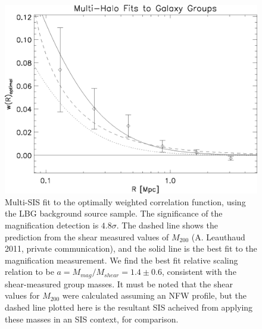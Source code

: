 \begin{figure}
\begin{center}
\includegraphics[scale=1.0]{plots_ch2/wopt_nfw_sis_44x_LFam1_aveErr07magcut.eps}
\caption[Optimally-Weighted Cross-Correlation]{Multi-SIS fit to the optimally weighted correlation function, using the LBG background source sample. The significance of the magnification detection is $4.8 \sigma$.  The dashed line shows the prediction from the shear measured values of $M_{200}$ (A. Leauthaud 2011, private communication), and the solid line is the best fit to the magnification measurement.  We find the best fit relative scaling relation to be $a= M_{mag}/M_{shear}=1.4 \pm 0.6$, consistent with the shear-measured group masses.  It must be noted that the shear values for $M_{200}$ were calculated assuming an NFW profile, but the dashed line plotted here is the resultant SIS acheived from applying these masses in an SIS context, for comparison.}
\label{multisis}
\end{center}
\end{figure}


